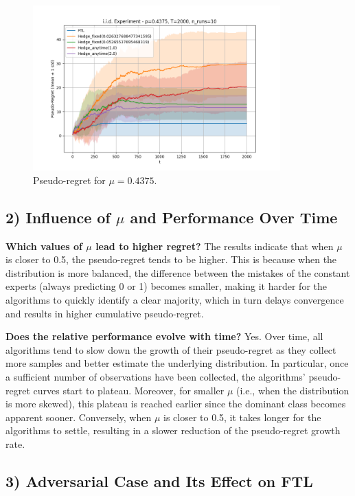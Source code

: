 \begin{figure}[H]
\centering
\includegraphics[width=0.85\textwidth]{Code/plot_iid_04375.png}
\caption{Pseudo-regret for \(\mu=0.4375\).}
\label{fig:plot_mu04375}
\end{figure}

\subsection*{2) Influence of \texorpdfstring{$\mu$}{mu} and Performance Over Time}

\textbf{Which values of \(\mu\) lead to higher regret?}  
The results indicate that when \(\mu\) is closer to 0.5, the pseudo-regret tends to be higher. This is because when the distribution is more balanced, the difference between the mistakes of the constant experts (always predicting 0 or 1) becomes smaller, making it harder for the algorithms to quickly identify a clear majority, which in turn delays convergence and results in higher cumulative pseudo-regret.

\textbf{Does the relative performance evolve with time?}  
Yes. Over time, all algorithms tend to slow down the growth of their pseudo-regret as they collect more samples and better estimate the underlying distribution. In particular, once a sufficient number of observations have been collected, the algorithms' pseudo-regret curves start to plateau. Moreover, for smaller \(\mu\) (i.e., when the distribution is more skewed), this plateau is reached earlier since the dominant class becomes apparent sooner. Conversely, when \(\mu\) is closer to 0.5, it takes longer for the algorithms to settle, resulting in a slower reduction of the pseudo-regret growth rate.

\subsection*{3) Adversarial Case and Its Effect on FTL}


